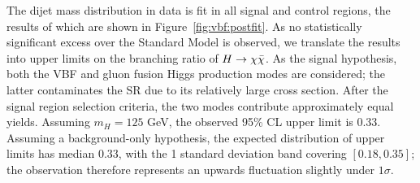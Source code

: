 The dijet mass distribution in data is fit in all signal and control regions, the results of which are shown in Figure~\ref{fig:vbf:postfit}.
As no statistically significant excess over the Standard Model is observed, we translate the results into upper limits on the branching ratio of $H\rightarrow\chi\bar\chi$.
As the signal hypothesis, both the VBF and gluon fusion Higgs production modes are considered; the latter contaminates the SR due to its relatively large cross section.
After the signal region selection criteria, the two modes contribute approximately equal yields. 
Assuming $m_H=125$ GeV, the observed 95\% CL upper limit is 0.33. 
Assuming a background-only hypothesis, the expected distribution of upper limits has median $0.33$, with the 1 standard deviation band covering $[0.18,0.35]$; the observation therefore represents an upwards fluctuation slightly under $1\sigma$. 

